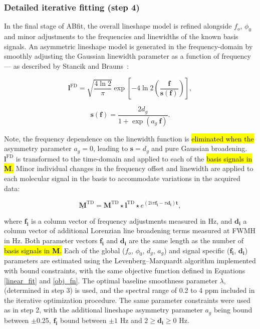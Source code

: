 \documentclass[num-refs]{wiley-article}
\newcommand{\revone}[2]{\hl{#1}\marginnote{\hl{#2}}}
\begin{document}
\subsubsection{Detailed iterative fitting (step 4)}
In the final stage of ABfit, the overall lineshape model is refined alongside $f_{o}$, $\phi_{0}$ and minor adjustments to the frequencies and linewidths of the known basis signals. An asymmetric lineshape model is generated in the frequency-domain by smoothly adjusting the Gaussian linewidth parameter as a function of frequency --- as described by Stancik and Brauns~\cite{Stancik2008}:

\begin{equation}
  \mathbf{l}^{\mathrm{FD}} = \sqrt{\frac{4 \ln 2}{\pi}} \exp \left[ -4 \ln2 \left( \frac{\mathbf{f}}{\mathbf{s}(\mathbf{f})} \right) \right],
\end{equation}

\begin{equation}
  \mathbf{s}(\mathbf{f}) = \frac{2 d_{g}}{1 + \exp(a_{g} \ \mathbf{f})}.
\end{equation}

Note, the frequency dependence on the linewidth function is \revone{eliminated when the}{R1.21} asymmetry parameter $a_{g}=0$, leading to $\mathbf{s}=d_{g}$ and pure Gaussian broadening. $\mathbf{l}^{\mathrm{FD}}$ is transformed to the time-domain and applied to each of the \revone{basis signals in $\mathbf{M}$.}{R2.10} Minor individual changes in the frequency offset and linewidth are applied to each molecular signal in the basis to accommodate variations in the acquired data:

\begin{equation}
    \underline{\mathbf{M}}^{\mathrm{TD}} = \mathbf{M}^{\mathrm{TD}} \star \mathbf{l}^{\mathrm{TD}} \star e^{(2i \pi \mathbf{f_{i}} - \pi \mathbf{d_{i}} ) \mathbf{t}},
\end{equation}

where $\mathbf{f_{i}}$ is a column vector of frequency adjustments measured in Hz, and $\mathbf{d_{i}}$ a column vector of additional Lorenzian line broadening terms measured at FWMH in Hz. Both parameter vectors $\mathbf{f_{i}}$ and $\mathbf{d_{i}}$ are the same length as the number of \revone{basis signals in $\mathbf{M}$.}{R2.10} Each of the global ($f_{o}$, $\phi_{0}$, $d_{g}$, $a_{g}$) and signal specific ($\mathbf{f_{i}}$, $\mathbf{d_{i}}$) parameters are estimated using the Levenberg–Marquardt algorithm \cite{Levenberg1944} implemented with bound constraints, with the same objective function defined in Equations \ref{linear_fit} and \ref{obj_fn}. The optimal baseline smoothness parameter $\lambda$, (determined in step 3) is used, and the spectral range of 0.2 to 4 ppm included in the iterative optimization procedure. The same parameter constraints were used as in step 2, with the additional lineshape asymmetry parameter $a_{g}$ being bound between $\pm$0.25, $\mathbf{f_{i}}$ bound between $\pm1$ Hz and  $2 \geq \mathbf{d_{i}} \geq 0$ Hz.
\end{document}
